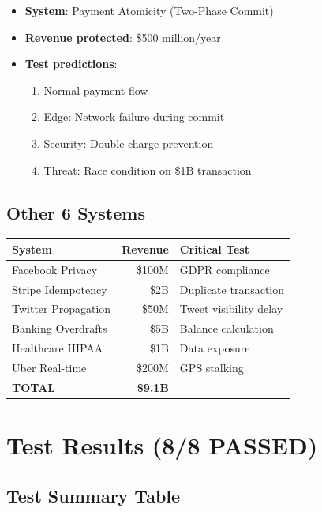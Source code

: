 \documentclass[12pt,a4paper]{report}
\begin{document}
\begin{itemize}
    \item \textbf{System}: Payment Atomicity (Two-Phase Commit)
    \item \textbf{Revenue protected}: \$500 million/year
    \item \textbf{Test predictions}:
    \begin{enumerate}
        \item Normal payment flow
        \item Edge: Network failure during commit
        \item Security: Double charge prevention
        \item Threat: Race condition on \$1B transaction
    \end{enumerate}
\end{itemize}

\section{Other 6 Systems}

\begin{table}[h]
\centering
\begin{tabular}{|l|r|l|}
\hline
\textbf{System} & \textbf{Revenue} & \textbf{Critical Test} \\
\hline
Facebook Privacy & \$100M & GDPR compliance \\
Stripe Idempotency & \$2B & Duplicate transaction \\
Twitter Propagation & \$50M & Tweet visibility delay \\
Banking Overdrafts & \$5B & Balance calculation \\
Healthcare HIPAA & \$1B & Data exposure \\
Uber Real-time & \$200M & GPS stalking \\
\hline
\textbf{TOTAL} & \textbf{\$9.1B} & \\
\hline
\end{tabular}
\end{table}

\chapter{Test Results (8/8 PASSED)}

\section{Test Summary Table}
\end{document}
